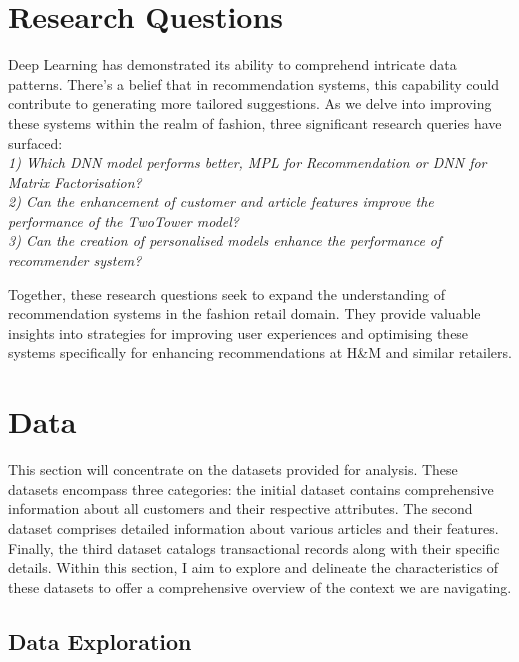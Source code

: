 \documentclass[conference,compsoc]{IEEEtran}
\begin{document}
\section{Research Questions}

Deep Learning has demonstrated its ability to comprehend intricate data patterns. There's a belief that in recommendation systems, this capability could contribute to generating more tailored suggestions. As we delve into improving these systems within the realm of fashion, three significant research queries have surfaced:
\vspace{10pt}\\
\textit{1) Which DNN model performs better, MPL for Recommendation or DNN for Matrix Factorisation?}
\vspace{10pt}\\
\textit{2) Can the enhancement of customer and article features improve the performance of the TwoTower model?}
\vspace{10pt}\\
\textit{3) Can the creation of personalised models enhance the performance of recommender system?}
\vspace{12pt}

Together, these research questions seek to expand the understanding of recommendation systems in the fashion retail domain. They provide valuable insights into strategies for improving user experiences and optimising these systems specifically for enhancing recommendations at H\&M and similar retailers.

\section{Data}

This section will concentrate on the datasets provided for analysis. These datasets encompass three categories: the initial dataset contains comprehensive information about all customers and their respective attributes. The second dataset comprises detailed information about various articles and their features. Finally, the third dataset catalogs transactional records along with their specific details. Within this section, I aim to explore and delineate the characteristics of these datasets to offer a comprehensive overview of the context we are navigating.

\subsection{Data Exploration}
\end{document}
